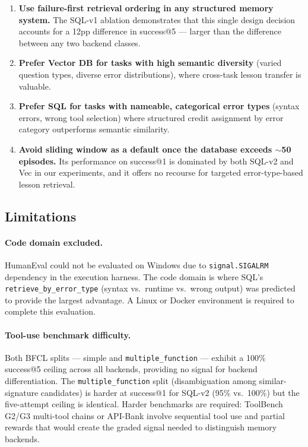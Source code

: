\documentclass{article}
\begin{document}
\begin{enumerate}
  \item \textbf{Use failure-first retrieval ordering in any structured memory
    system.} The SQL-v1 ablation demonstrates that this single design decision
    accounts for a 12pp difference in success@5 --- larger than the difference
    between any two backend classes.
  \item \textbf{Prefer Vector DB for tasks with high semantic diversity} (varied
    question types, diverse error distributions), where cross-task lesson
    transfer is valuable.
  \item \textbf{Prefer SQL for tasks with nameable, categorical error types}
    (syntax errors, wrong tool selection) where structured credit assignment
    by error category outperforms semantic similarity.
  \item \textbf{Avoid sliding window as a default once the database exceeds
    $\sim$50 episodes.} Its performance on success@1 is dominated by both SQL-v2
    and Vec in our experiments, and it offers no recourse for targeted
    error-type-based lesson retrieval.
\end{enumerate}

\subsection{Limitations}

\paragraph{Code domain excluded.}
HumanEval \citep{chen2021humaneval} could not be evaluated on Windows due to
\texttt{signal.SIGALRM} dependency in the execution harness. The code domain
is where SQL's \texttt{retrieve\_by\_error\_type} (syntax vs.\ runtime vs.\
wrong output) was predicted to provide the largest advantage. A Linux or Docker
environment is required to complete this evaluation.

\paragraph{Tool-use benchmark difficulty.}
Both BFCL splits --- simple and \texttt{multiple\_function} --- exhibit a
100\% success@5 ceiling across all backends, providing no signal for backend
differentiation. The \texttt{multiple\_function} split (disambiguation among
similar-signature candidates) is harder at success@1 for SQL-v2 (95\% vs.\
100\%) but the five-attempt ceiling is identical. Harder benchmarks are
required: ToolBench G2/G3 multi-tool chains \citep{qin2023toolllm} or
API-Bank \citep{li2023apibank} involve sequential tool use and partial rewards
that would create the graded signal needed to distinguish memory backends.
\end{document}
